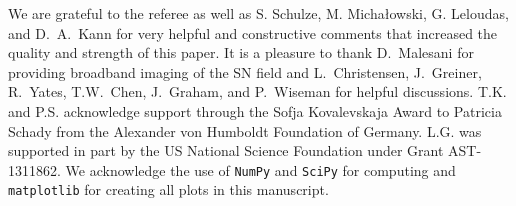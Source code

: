 \documentclass[traditabstract]{aa}
\begin{document}
\begin{acknowledgements}

{We are grateful to the referee as well as S. Schulze, M. {Micha{\l}owski}, G. Leloudas, and D.~A.~Kann for very helpful and constructive comments that increased the quality and strength of this paper.} It is a pleasure to thank D.~Malesani for providing broadband imaging of the SN field and L.~Christensen, J.~Greiner, R.~Yates, T.W.~Chen, J.~Graham, and P.~Wiseman for helpful discussions. T.K. and P.S. acknowledge support through the Sofja Kovalevskaja Award to Patricia Schady from the Alexander von Humboldt Foundation of Germany. L.G. was supported in part by the US National Science Foundation under Grant AST-1311862. We acknowledge the use of \texttt{NumPy} and \texttt{SciPy} \citep{Walt:2011:NAS:1957373.1957466} for computing and \texttt{matplotlib} \citep{Hunter:2007} for creating all plots in this manuscript. 

\end{acknowledgements}



\end{document}
